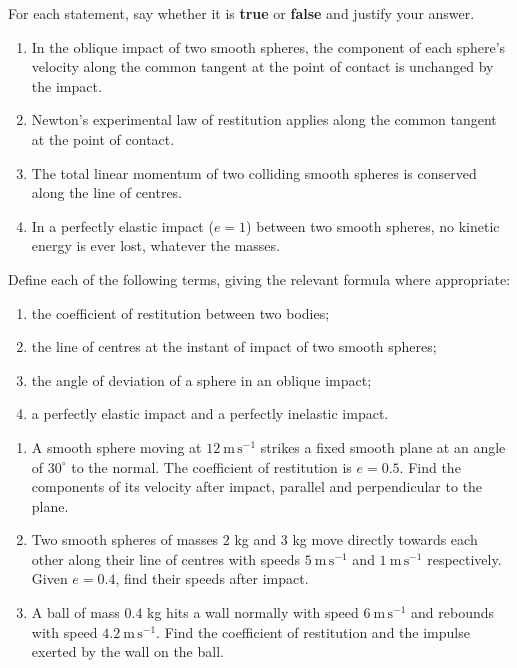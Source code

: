 \documentclass[11pt]{article}
\newcommand{\cle}[1]{{\popxbold\color{popdark}#1}}
\begin{document}
\begin{exercice}
For each statement, say whether it is \textbf{true} or \textbf{false} and justify your answer.
\begin{enumerate}
\item In the oblique impact of two smooth spheres, the component of each sphere's velocity along the common tangent at the point of contact is unchanged by the impact.
\item Newton's experimental law of restitution applies along the common tangent at the point of contact.
\item The total linear momentum of two colliding smooth spheres is conserved along the line of centres.
\item In a perfectly elastic impact ($e=1$) between two smooth spheres, no kinetic energy is ever lost, whatever the masses.
\end{enumerate}
\end{exercice}

\begin{exercice}[Definitions]
Define each of the following terms, giving the relevant formula where appropriate:
\begin{enumerate}
\item the \cle{coefficient of restitution} between two bodies;
\item the \cle{line of centres} at the instant of impact of two smooth spheres;
\item the \cle{angle of deviation} of a sphere in an oblique impact;
\item a \cle{perfectly elastic} impact and a \cle{perfectly inelastic} impact.
\end{enumerate}
\end{exercice}

\begin{exercice}
\begin{enumerate}
\item A smooth sphere moving at $12\ \mathrm{m\,s^{-1}}$ strikes a fixed smooth plane at an angle of $30^{\circ}$ to the normal. The coefficient of restitution is $e=0.5$. Find the components of its velocity after impact, parallel and perpendicular to the plane.
\item Two smooth spheres of masses $2$ kg and $3$ kg move directly towards each other along their line of centres with speeds $5\ \mathrm{m\,s^{-1}}$ and $1\ \mathrm{m\,s^{-1}}$ respectively. Given $e=0.4$, find their speeds after impact.
\item A ball of mass $0.4$ kg hits a wall normally with speed $6\ \mathrm{m\,s^{-1}}$ and rebounds with speed $4.2\ \mathrm{m\,s^{-1}}$. Find the coefficient of restitution and the impulse exerted by the wall on the ball.
\end{enumerate}
\end{exercice}
\end{document}
